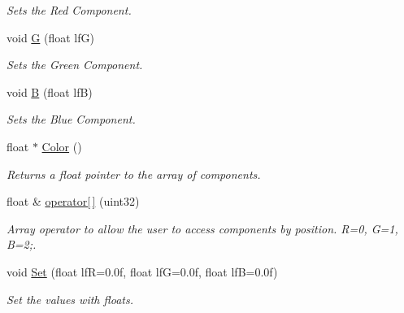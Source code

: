 \begin{DoxyCompactItemize}
\begin{DoxyCompactList}\small\item\em Sets the Red Component. \end{DoxyCompactList}\item 
\hypertarget{classc_r_g_b_aaccf70ef2ddad7617f123d84e6242392}{
void \hyperlink{classc_r_g_b_aaccf70ef2ddad7617f123d84e6242392}{G} (float lfG)}
\label{classc_r_g_b_aaccf70ef2ddad7617f123d84e6242392}

\begin{DoxyCompactList}\small\item\em Sets the Green Component. \end{DoxyCompactList}\item 
\hypertarget{classc_r_g_b_a5c7ceecce5f8c558cebf7bd214d304db}{
void \hyperlink{classc_r_g_b_a5c7ceecce5f8c558cebf7bd214d304db}{B} (float lfB)}
\label{classc_r_g_b_a5c7ceecce5f8c558cebf7bd214d304db}

\begin{DoxyCompactList}\small\item\em Sets the Blue Component. \end{DoxyCompactList}\item 
\hypertarget{classc_r_g_b_a4e1d05eb87499169150216067361c53c}{
float $\ast$ \hyperlink{classc_r_g_b_a4e1d05eb87499169150216067361c53c}{Color} ()}
\label{classc_r_g_b_a4e1d05eb87499169150216067361c53c}

\begin{DoxyCompactList}\small\item\em Returns a float pointer to the array of components. \end{DoxyCompactList}\item 
\hypertarget{classc_r_g_b_ad24f57ecec4046a4580436f2c63462cb}{
float \& \hyperlink{classc_r_g_b_ad24f57ecec4046a4580436f2c63462cb}{operator\mbox{[}$\,$\mbox{]}} (uint32)}
\label{classc_r_g_b_ad24f57ecec4046a4580436f2c63462cb}

\begin{DoxyCompactList}\small\item\em Array operator to allow the user to access components by position. R=0, G=1, B=2;. \end{DoxyCompactList}\item 
\hypertarget{classc_r_g_b_a59ec50d713ed372b57125ef1f5c58d06}{
void \hyperlink{classc_r_g_b_a59ec50d713ed372b57125ef1f5c58d06}{Set} (float lfR=0.0f, float lfG=0.0f, float lfB=0.0f)}
\label{classc_r_g_b_a59ec50d713ed372b57125ef1f5c58d06}

\begin{DoxyCompactList}\small\item\em Set the values with floats. \end{DoxyCompactList}\end{DoxyCompactItemize}


